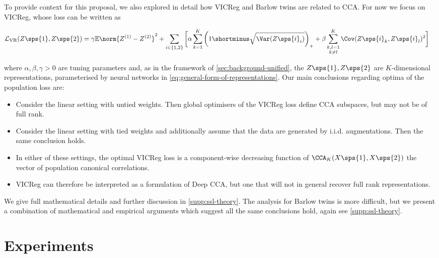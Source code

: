 To provide context for this proposal, we also explored in detail how VICReg and Barlow twins are related to CCA.
For now we focus on VICReg, whose loss can be written as
\begin{small}\begin{align*}
                 \mathcal{L}_\text{VR}(Z\sps{1}, Z\sps{2})
                 &= \gamma \mathbb{E} \norm{Z^{(1)} - Z^{(2)}}^2 + \sum_{i \in \{1,2\}} \bigg[\alpha \sum_{k=1}^K \left(1 \shortminus \sqrt{\Var(Z\sps{i}_i)}\right)_+ + \beta \sum_{\substack{k,l=1 \\ k \neq l}}^K \Cov(Z\sps{i}_k,Z\sps{i}_l)^2 \bigg]
\end{align*}\end{small}%
where $\alpha, \beta, \gamma > 0$ are tuning parameters and, as in the framework of \cref{sec:background-unified}, the $Z\sps{1}, Z\sps{2}$ are $K$-dimensional representations, parameterised by neural networks in \cref{eq:general-form-of-representations}.
Our main conclusions regarding optima of the population loss are:
\begin{itemize}
    \item Consider the linear setting with untied weights. Then global optimisers of the VICReg loss define CCA subspaces, but may not be of full rank.
    \item Consider the linear setting with tied weights and additionally assume that the data are generated by i.i.d. augmentations. Then the same conclusion holds.
    \item In either of these settings, the optimal VICReg loss is a component-wise decreasing function of $\CCA_K(X\sps{1}, X\sps{2})$ the vector of population canonical correlations.
    \item VICReg can therefore be interpreted as a formulation of Deep CCA, but one that will not in general recover full rank representations.
\end{itemize}

We give full mathematical details and further discussion in \cref{supp:ssl-theory}.
The analysis for Barlow twins is more difficult, but we present a combination of mathematical and empirical arguments which suggest all the same conclusions hold, again see \cref{supp:ssl-theory}.

\section{Experiments}\label{Experiments}

